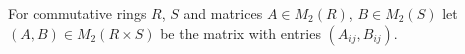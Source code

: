 For commutative rings $R$, $S$ and matrices $A\in M_2(R)$, $B\in M_2(S)$ let $(A,B)\in M_2(R\times S)$ be the matrix with entries $(A_{ij},B_{ij})$.
